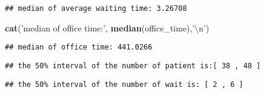 \documentclass[]{article}
\newenvironment{Shaded}{\begin{snugshade}}{\end{snugshade}}
\newcommand{\KeywordTok}[1]{\textcolor[rgb]{0.13,0.29,0.53}{\textbf{#1}}}
\newcommand{\DataTypeTok}[1]{\textcolor[rgb]{0.13,0.29,0.53}{#1}}
\newcommand{\FloatTok}[1]{\textcolor[rgb]{0.00,0.00,0.81}{#1}}
\newcommand{\CharTok}[1]{\textcolor[rgb]{0.31,0.60,0.02}{#1}}
\newcommand{\StringTok}[1]{\textcolor[rgb]{0.31,0.60,0.02}{#1}}
\newcommand{\NormalTok}[1]{#1}
\begin{document}
\begin{verbatim}
## median of average waiting time: 3.26708
\end{verbatim}

\begin{Shaded}
\begin{Highlighting}[]
\KeywordTok{cat}\NormalTok{(}\StringTok{'median of office time:'}\NormalTok{, }\KeywordTok{median}\NormalTok{(office_time),}\StringTok{'}\CharTok{\textbackslash{}n}\StringTok{'}\NormalTok{)}
\end{Highlighting}
\end{Shaded}

\begin{verbatim}
## median of office time: 441.0266
\end{verbatim}

\begin{Shaded}
\end{Shaded}

\begin{verbatim}
## the 50% interval of the number of patient is:[ 38 , 48 ]
\end{verbatim}

\begin{Shaded}
\end{Shaded}

\begin{verbatim}
## the 50% interval of the number of wait is: [ 2 , 6 ]
\end{verbatim}
\end{document}
